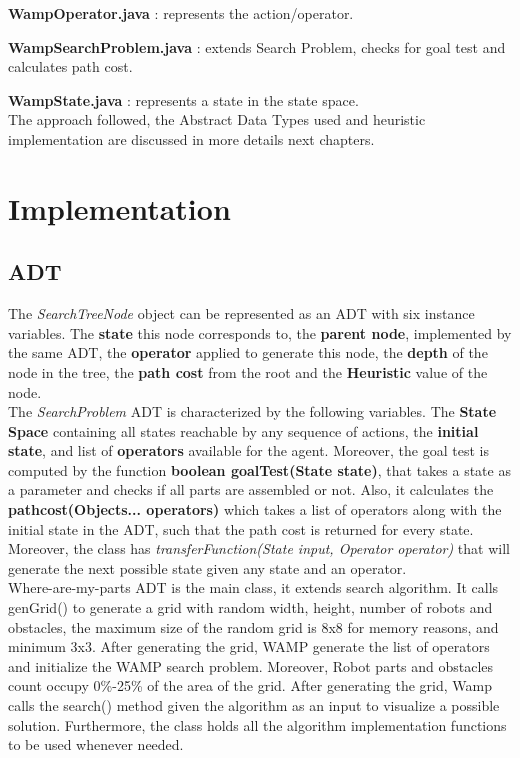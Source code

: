 \textbf{WampOperator.java} : represents the action/operator.

\textbf{WampSearchProblem.java} : extends Search Problem, checks for goal test and calculates path cost.

\textbf{WampState.java} : represents a state in the state space.\\

The approach followed, the Abstract Data Types used and heuristic implementation are discussed in more details next chapters.

\chapter{Implementation}


\section{ADT}
The \textit{SearchTreeNode} object can be represented as an ADT with six instance variables. The \textbf{state} this node corresponds to, the \textbf{parent node}, implemented by the same ADT, the \textbf{operator} applied to generate this node, the \textbf{depth} of the node in the tree, the \textbf{path cost} from the root and the \textbf{Heuristic} value of the node.\\

The \textit{SearchProblem} ADT is characterized by the following variables. The \textbf{State Space} containing all states reachable by any sequence of actions, the \textbf{initial state}, and list of \textbf{operators} available for the agent. Moreover, the goal test is computed by the function \textbf{boolean goalTest(State state)}, that takes a state as a parameter and checks if all parts are assembled or not. Also, it calculates the \textbf{pathcost(Objects... operators)} which takes a list of operators along with the initial state in the ADT, such that the path cost is returned for every state. Moreover, the class has \textit{transferFunction(State input, Operator operator)} that will generate the next possible state given any state and an operator.\\

Where-are-my-parts ADT is the main class, it extends search algorithm. It calls genGrid() to generate a grid with random width, height, number of robots and obstacles, the maximum size of the random grid is 8x8 for memory reasons, and minimum 3x3. After generating the grid, WAMP generate the list of operators and initialize the WAMP search problem. Moreover, Robot parts and obstacles count occupy 0\%-25\% of the area of the grid. After generating the grid, Wamp calls the search() method given the algorithm as an input to visualize a possible solution. Furthermore, the class holds all the algorithm implementation functions to be used whenever needed.
\newpage

